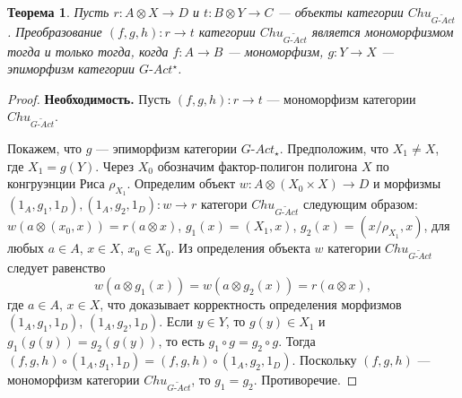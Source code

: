 \documentclass[a4paper,12pt]{article}
\newtheorem{theorem}{Теорема}
\newcommand{\GAct}{G\text{-}Act}
\begin{document}
\begin{theorem}\label{monomorphism-gact}
    Пусть $r: A \otimes X \to D$ и $t: B \otimes Y \to C$ --- объекты категории $Chu_{\widetilde{\GAct}}$. Преобразование $(f,g,h): r \to t$ категории $Chu_{\widetilde{\GAct}}$ является мономорфизмом тогда и только тогда, когда $f: A \to B$ --- мономорфизм, $g: Y \to X$ --- эпиморфизм категории $\GAct^{\star}$.
\end{theorem}
\begin{proof}
    \textbf{Необходимость.} Пусть $(f,g,h): r \to t$ --- мономорфизм категории $Chu_{\widetilde{\GAct}}$.

    Покажем, что $g$ --- эпиморфизм категории $\GAct_{\star}$. Предположим, что $X_1 \ne X$, где $X_1 = g(Y)$. Через $X_0$ обозначим фактор-полигон полигона $X$ по конгруэнции Риса $\rho_{X_1}$. Определим объект $w: A \otimes (X_0 \times X) \to D$ и морфизмы $(1_A,g_1,1_D), (1_A,g_2,1_D): w \to r$ категори $Chu_{\widetilde{\GAct}}$ следующим образом: $w(a \otimes (x_0,x)) = r(a \otimes x)$, $g_1(x) = (X_1,x)$, $g_2(x) = (x/\rho_{X_1}, x)$, для любых $a \in A$, $x \in X$, $x_0 \in X_0$. Из определения объекта $w$ категории $Chu_{\widetilde{\GAct}}$ следует равенство
    $$
        w(a \otimes g_1(x)) = w(a \otimes g_2(x)) = r(a \otimes x),
    $$ 
    где $a \in A$, $x \in X$, что доказывает корректность определения морфизмов $(1_A,g_1,1_D)$, $(1_A,g_2,1_D)$. Если $y \in Y$, то $g(y) \in X_1$ и $g_1(g(y)) = g_2(g(y))$, то есть $g_1 \circ g = g_2 \circ g$. Тогда $(f,g,h) \circ (1_A,g_1,1_D) = (f,g,h) \circ (1_A,g_2,1_D)$. Поскольку $(f,g,h)$ --- мономорфизм категории $Chu_{\widetilde{\GAct}}$, то $g_1 = g_2$. Противоречие.


\end{proof}
\end{document}
